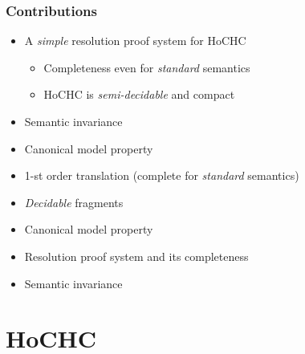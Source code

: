 \documentclass{beamer}
\begin{document}
\begin{frame}
{    
    
  }

\end{frame}

\begin{frame}
  \frametitle{Contributions}
  \begin{itemize}
  \item A \emph{simple} resolution proof system for HoCHC
    \begin{itemize}
    \item Completeness even for \emph{standard} semantics
    \item HoCHC is \emph{semi-decidable} and compact
    \end{itemize}
  \item Semantic invariance\pause
  \item Canonical model property
  \item 1-st order translation (complete for \emph{standard}
    semantics)
  \item \emph{Decidable} fragments
  \end{itemize}

  \pause
  \begin{itemize}
  \item Canonical model property 
  \item Resolution proof system and its completeness
  \item Semantic invariance
  \end{itemize}
\end{frame}

\section{HoCHC}
\end{document}

